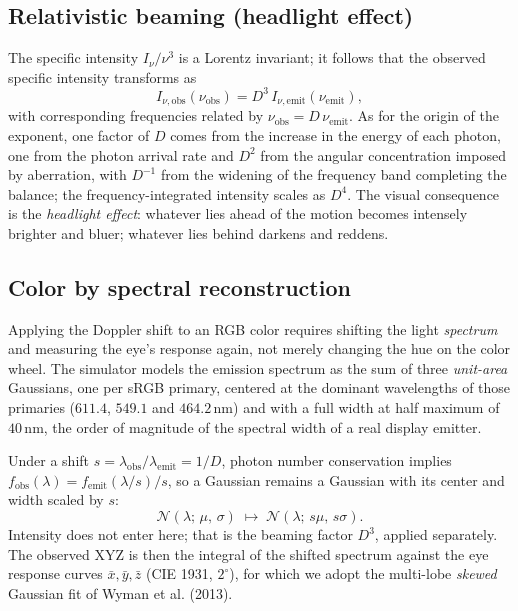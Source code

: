 \documentclass[10pt,a4paper,twocolumn]{article}
\begin{document}
\subsection{Relativistic beaming (headlight effect)}

The specific intensity $I_{\nu}/\nu^{3}$ is a Lorentz invariant; it follows that the
observed specific intensity transforms as
\begin{equation}
  I_{\nu,\mathrm{obs}}(\nu_{\mathrm{obs}}) = D^{3}\,I_{\nu,\mathrm{emit}}(\nu_{\mathrm{emit}}),
  \label{eq:beaming}
\end{equation}
with corresponding frequencies related by $\nu_{\mathrm{obs}} = D\,\nu_{\mathrm{emit}}$.
As for the origin of the exponent, one factor of $D$ comes from the increase in the
energy of each photon, one from the photon arrival rate and $D^{2}$ from the angular
concentration imposed by aberration, with $D^{-1}$ from the widening of the frequency
band completing the balance; the frequency-integrated intensity scales as $D^{4}$. The
visual consequence is the \emph{headlight effect}: whatever lies ahead of the motion
becomes intensely brighter and bluer; whatever lies behind darkens and reddens.

\subsection{Color by spectral reconstruction}
\label{sec:cor}

Applying the Doppler shift to an RGB color requires shifting the light \emph{spectrum}
and measuring the eye's response again, not merely changing the hue on the color wheel.
The simulator models the emission spectrum as the sum of three \emph{unit-area} Gaussians,
one per sRGB primary, centered at the dominant wavelengths of those primaries
($611.4$, $549.1$ and $464.2\,\mathrm{nm}$) and with a full width at half maximum of
$40\,\mathrm{nm}$, the order of magnitude of the spectral width of a real display emitter.

Under a shift $s = \lambda_{\mathrm{obs}}/\lambda_{\mathrm{emit}} = 1/D$, photon number
conservation implies $f_{\mathrm{obs}}(\lambda) = f_{\mathrm{emit}}(\lambda/s)/s$, so a
Gaussian remains a Gaussian with its center and width scaled by $s$:
\begin{equation}
  \mathcal{N}(\lambda;\,\mu,\,\sigma) \;\longmapsto\;
  \mathcal{N}(\lambda;\,s\mu,\,s\sigma).
  \label{eq:lobeshift}
\end{equation}
Intensity does not enter here; that is the beaming factor $D^{3}$, applied separately. The
observed XYZ is then the integral of the shifted spectrum against the eye response curves
$\bar{x},\bar{y},\bar{z}$ (CIE 1931, $2^{\circ}$), for which we adopt the multi-lobe
\emph{skewed} Gaussian fit of Wyman et al. (2013).
\end{document}
